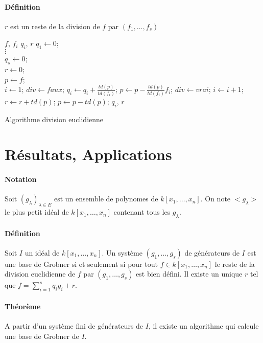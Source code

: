 \documentclass[12pt,a4paper]{report}
\begin{document}
\paragraph{Définition\\}
$r$ est un reste de la division de $f$ par $(f_1,\ldots,f_s)$
\begin{algorithm}[h!]
\begin{algorithmic}[1]
\REQUIRE $f$, $f_i$
\ENSURE $q_i$, $r$
\STATE $q_1 \leftarrow 0$;\\
$ \vdots $\\
$ q_s \leftarrow 0$;\\
$r\leftarrow 0$;\\
$ p \leftarrow f$;\\
\STATE $i\leftarrow 1$; $div \leftarrow faux$;
\STATE $q_i \leftarrow q_i + \frac{td(p)}{td(f_i)}$;
\STATE $p \leftarrow p - \frac{td(p)}{td(f_i)} f_i $;
\STATE $div \leftarrow vrai $;
\ELSE
\STATE $i \leftarrow i+1$;
\ENDIF
\ENDWHILE
{}
\STATE $r \leftarrow r+td(p)$;
\STATE $p \leftarrow p-td(p)$;
\ENDIF
\ENDWHILE
\RETURN $q_i$, $r$
\end{algorithmic}
\caption{Algorithme division euclidienne}
\end{algorithm}
\section{Résultats, Applications}
\paragraph{Notation\\}
Soit $(g_{\lambda})_{\lambda \in E}$ est un ensemble de polynomes de $k[x_1,\ldots,x_n]$. On note $<g_{\lambda}>$ le plus petit idéal de $k[x_1,\ldots,x_n]$ contenant tous les $g_{\lambda}$.
\paragraph{Définition\\}
Soit $I$ un idéal de $k[x_1,\ldots,x_n]$. Un système $(g_1,\ldots,g_s)$ de générateurs de $I$ est une base de Grobner si et seulement si pour tout $f \in k[x_1,\ldots,x_n]$ le reste de la division euclidienne de $f$ par $(g_1,\ldots,g_s)$ est bien défini. Il existe un unique $r$ tel que $f= \sum\limits_{i=1}^s q_ig_i + r$.
\paragraph{Théorème\\}
A partir d'un système fini de générateurs de $I$, il existe un algorithme qui calcule une base de Grobner de $I$.\\
\end{document}
